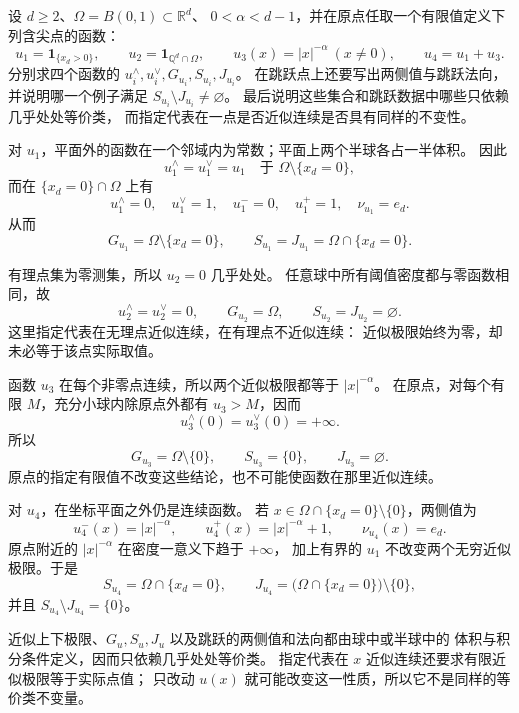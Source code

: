 \begin{exercise}\label{b1:ex:28-basic-approximate-limits}
设 \(d\ge2\)、\(\Omega=B(0,1)\subset\mathbb R^d\)、
\(0<\alpha<d-1\)，并在原点任取一个有限值定义下列含尖点的函数：
\[
 u_1=\mathbf1_{\{x_d>0\}},\qquad
 u_2=\mathbf1_{\mathbb Q^d\cap\Omega},\qquad
 u_3(x)=|x|^{-\alpha}\ (x\ne0),\qquad
 u_4=u_1+u_3.
\]
分别求四个函数的 \(u_i^\wedge,u_i^\vee,G_{u_i},S_{u_i},J_{u_i}\)。
在跳跃点上还要写出两侧值与跳跃法向，并说明哪一个例子满足
\(S_{u_i}\setminus J_{u_i}\ne\varnothing\)。
最后说明这些集合和跳跃数据中哪些只依赖几乎处处等价类，
而指定代表在一点是否近似连续是否具有同样的不变性。
\end{exercise}
\begin{solution}
对 \(u_1\)，平面外的函数在一个邻域内为常数；平面上两个半球各占一半体积。
因此
\[
 u_1^\wedge=u_1^\vee=u_1\quad\text{于 }\Omega\setminus\{x_d=0\},
\]
而在 \(\{x_d=0\}\cap\Omega\) 上有
\[
 u_1^\wedge=0,\quad u_1^\vee=1,\quad
 u_1^-=0,\quad u_1^+=1,\quad \nu_{u_1}=e_d.
\]
从而
\[
 G_{u_1}=\Omega\setminus\{x_d=0\},\qquad
 S_{u_1}=J_{u_1}=\Omega\cap\{x_d=0\}.
\]

有理点集为零测集，所以 \(u_2=0\) 几乎处处。
任意球中所有阈值密度都与零函数相同，故
\[
 u_2^\wedge=u_2^\vee=0,\qquad
 G_{u_2}=\Omega,\qquad S_{u_2}=J_{u_2}=\varnothing.
\]
这里指定代表在无理点近似连续，在有理点不近似连续：
近似极限始终为零，却未必等于该点实际取值。

函数 \(u_3\) 在每个非零点连续，所以两个近似极限都等于 \(|x|^{-\alpha}\)。
在原点，对每个有限 \(M\)，充分小球内除原点外都有 \(u_3>M\)，因而
\[
 u_3^\wedge(0)=u_3^\vee(0)=+\infty.
\]
所以
\[
 G_{u_3}=\Omega\setminus\{0\},\qquad
 S_{u_3}=\{0\},\qquad J_{u_3}=\varnothing.
\]
原点的指定有限值不改变这些结论，也不可能使函数在那里近似连续。

对 \(u_4\)，在坐标平面之外仍是连续函数。
若 \(x\in\Omega\cap\{x_d=0\}\setminus\{0\}\)，两侧值为
\[
 u_4^-(x)=|x|^{-\alpha},\qquad
 u_4^+(x)=|x|^{-\alpha}+1,\qquad
 \nu_{u_4}(x)=e_d.
\]
原点附近的 \(|x|^{-\alpha}\) 在密度一意义下趋于 \(+\infty\)，
加上有界的 \(u_1\) 不改变两个无穷近似极限。于是
\[
 S_{u_4}=\Omega\cap\{x_d=0\},\qquad
 J_{u_4}=\bigl(\Omega\cap\{x_d=0\}\bigr)\setminus\{0\},
\]
并且 \(S_{u_4}\setminus J_{u_4}=\{0\}\)。

近似上下极限、\(G_u,S_u,J_u\) 以及跳跃的两侧值和法向都由球中或半球中的
体积与积分条件定义，因而只依赖几乎处处等价类。
指定代表在 \(x\) 近似连续还要求有限近似极限等于实际点值；
只改动 \(u(x)\) 就可能改变这一性质，所以它不是同样的等价类不变量。
\end{solution}

